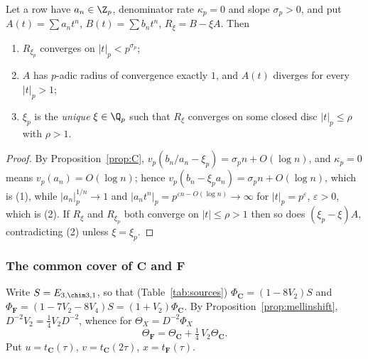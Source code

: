 \begin{lemma}\label{lem:overconv}
\Proved{} Let a row have $a_n\in\Z_p$, denominator rate $\kappa_p=0$ and slope
$\sigma_p>0$, and put $A(t)=\sum a_nt^n$, $B(t)=\sum b_nt^n$,
$R_\xi=B-\xi A$.  Then
\begin{enumerate}
\item $R_{\xi_p}$ converges on $|t|_p<p^{\sigma_p}$;
\item $A$ has $p$-adic radius of convergence exactly $1$, and $A(t)$ diverges for
every $|t|_p>1$;
\item $\xi_p$ is the \emph{unique} $\xi\in\Q_p$ such that $R_\xi$ converges on some
closed disc $|t|_p\le\rho$ with $\rho>1$.
\end{enumerate}
\end{lemma}
\begin{proof}
By Proposition~\ref{prop:C}, $v_p(b_n/a_n-\xi_p)=\sigma_pn+O(\log n)$, and
$\kappa_p=0$ means $v_p(a_n)=O(\log n)$; hence
$v_p(b_n-\xi_pa_n)=\sigma_pn+O(\log n)$, which is (1), while
$|a_n|_p^{1/n}\to1$ and $|a_nt^n|_p=p^{\varepsilon n-O(\log n)}\to\infty$ for
$|t|_p=p^\varepsilon$, $\varepsilon>0$, which is (2).  If $R_\xi$ and $R_{\xi_p}$
both converge on $|t|\le\rho>1$ then so does $(\xi_p-\xi)A$, contradicting (2)
unless $\xi=\xi_p$.
\end{proof}

\subsubsection*{The common cover of $\mathbf C$ and $\mathbf F$}

Write $S=E_{3,\chim3,1}$, so that (Table~\ref{tab:sources})
$\Phi_{\mathbf C}=(1-8V_2)S$ and $\Phi_{\mathbf F}=(1-7V_2-8V_4)S=(1+V_2)\Phi_{\mathbf C}$.
By Proposition~\ref{prop:mellinshift}, $D^{-2}V_2=\tfrac14V_2D^{-2}$, whence for
$\Theta_X=D^{-2}\Phi_X$
\begin{equation}\label{eq:thetaCF}
\Theta_{\mathbf F}=\Theta_{\mathbf C}+\tfrac14\,V_2\Theta_{\mathbf C}.
\end{equation}
Put $u=t_{\mathbf C}(\tau)$, $v=t_{\mathbf C}(2\tau)$, $x=t_{\mathbf F}(\tau)$.

